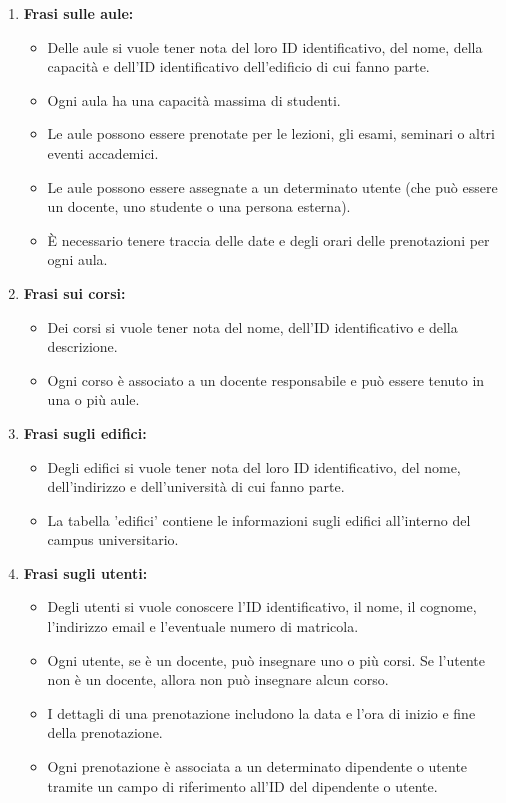 \documentclass[a4paper, 10pt, oneside]{article} %
\begin{document}
\begin{enumerate}
    \item \textbf{Frasi sulle aule:}
\begin{itemize}
    \item Delle aule si vuole tener nota del loro ID identificativo, del nome, della capacità e dell'ID identificativo dell'edificio di cui fanno parte.
    \item Ogni aula ha una capacità massima di studenti.
    \item Le aule possono essere prenotate per le lezioni, gli esami, seminari o altri eventi accademici.
    \item Le aule possono essere assegnate a un determinato utente (che può essere un docente, uno studente o una persona esterna).
    \item È necessario tenere traccia delle date e degli orari delle prenotazioni per ogni aula.


\end{itemize}

\item \textbf{Frasi sui corsi:}
\begin{itemize}
    \item Dei corsi si vuole tener nota del nome, dell'ID identificativo e della descrizione.
    \item Ogni corso è associato a un docente responsabile e può essere tenuto in una o più aule.
\end{itemize}

\item \textbf{Frasi sugli edifici:}

\begin{itemize}
    \item Degli edifici si vuole tener nota del loro ID identificativo, del nome, dell'indirizzo e dell'università di cui fanno parte.
    \item La tabella 'edifici' contiene le informazioni sugli edifici all'interno del campus universitario.
\end{itemize}


\item \textbf{Frasi sugli utenti:}

\begin{itemize}
    \item Degli utenti si vuole conoscere l'ID identificativo, il nome, il cognome, l'indirizzo email e l'eventuale numero di matricola.
    \item Ogni utente, se è un docente, può insegnare uno o più corsi. Se l'utente non è un docente, allora non può insegnare alcun corso.
    \item I dettagli di una prenotazione includono la data e l'ora di inizio e fine della prenotazione.
    \item Ogni prenotazione è associata a un determinato dipendente o utente tramite un campo di riferimento all'ID del dipendente o utente.
    

\end{itemize}
\end{enumerate}
\end{document}
